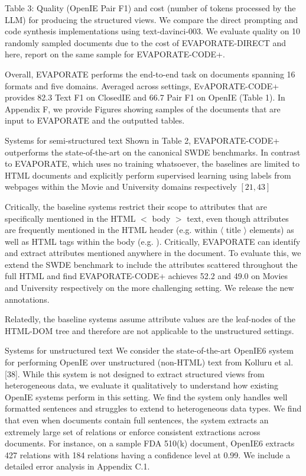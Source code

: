 \documentclass[10pt]{article}
\begin{document}
Table 3: Quality (OpenIE Pair F1) and cost (number of tokens processed by the LLM) for producing the structured views. We compare the direct prompting and code synthesis implementations using text-davinci-003. We evaluate quality on 10 randomly sampled documents due to the cost of EVAPORATE-DIRECT and here, report on the same sample for EVAPORATE-CODE+.

Overall, EVAPORATE performs the end-to-end task on documents spanning 16 formats and five domains. Averaged across settings, EvAPORATE-CODE+ provides 82.3 Text F1 on ClosedIE and 66.7 Pair F1 on OpenIE (Table 1). In Appendix F, we provide Figures showing samples of the documents that are input to EVAPORATE and the outputted tables.

Systems for semi-structured text Shown in Table 2, EVAPORATE-CODE+ outperforms the state-of-the-art on the canonical SWDE benchmarks. In contrast to EVAPORATE, which uses no training whatsoever, the baselines are limited to HTML documents and explicitly perform supervised learning using labels from webpages within the Movie and University domains respectively $[21,43]$

Critically, the baseline systems restrict their scope to attributes that are specifically mentioned in the HTML $<$ body $>$ text, even though attributes are frequently mentioned in the HTML header (e.g. within $\langle$ title $\rangle$ elements) as well as HTML tags within the body (e.g. ). Critically, EVAPORATE can identify and extract attributes mentioned anywhere in the document. To evaluate this, we extend the SWDE benchmark to include the attributes scattered throughout the full HTML and find EVAPORATE-CODE+ achieves 52.2 and 49.0 on Movies and University respectively on the more challenging setting. We release the new annotations.

Relatedly, the baseline systems assume attribute values are the leaf-nodes of the HTML-DOM tree and therefore are not applicable to the unstructured settings.

Systems for unstructured text We consider the state-of-the-art OpenIE6 system for performing OpenIE over unstructured (non-HTML) text from Kolluru et al. [38]. While this system is not designed to extract structured views from heterogeneous data, we evaluate it qualitatively to understand how existing OpenIE systems perform in this setting. We find the system only handles well formatted sentences and struggles to extend to heterogeneous data types. We find that even when documents contain full sentences, the system extracts an extremely large set of relations or enforce consistent extractions across documents. For instance, on a sample FDA 510(k) document, OpenIE6 extracts 427 relations with 184 relations having a confidence level at 0.99. We include a detailed error analysis in Appendix C.1.
\end{document}
